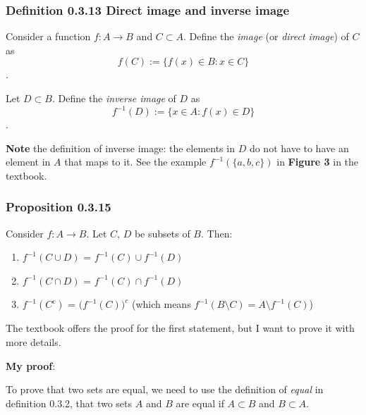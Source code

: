 \documentclass[12pt, letterpaper, oneside]{book}
\begin{document}
\subsubsection*{Definition 0.3.13 Direct image and inverse image}

Consider a function $f: A \rightarrow B$ and $C \subset A$. Define the
\textit{image} (or \textit{direct image}) of $C$ as \[ f(C) := \{f(x) \in B:
x \in C\} \].

Let $D \subset B$. Define the \textit{inverse image} of $D$ as \[ f^{-1}(D) :=
\{x \in A: f(x) \in D\}\].

\textbf{Note} the definition of inverse image: the elements in $D$ do not have
to have an element in $A$ that maps to it. See the example $f^{-1}(\{a,b,c\})$
in \textbf{Figure 3} in the textbook.

\subsubsection*{Proposition 0.3.15}

Consider $f: A \rightarrow B$. Let $C$, $D$ be subsets of $B$. Then:
\begin{enumerate}
  \item $f^{-1}(C \cup D)$ = $f^{-1}(C) \cup f^{-1}(D)$
  \item $f^{-1}(C \cap D)$ = $f^{-1}(C) \cap f^{-1}(D)$
  \item $f^{-1}(C^c)$ = $\bigl(f^{-1}(C)\bigr)^c$ (which means $f^{-1}(B
    \setminus C) = A \setminus f^{-1}(C)$)
\end{enumerate}

The textbook offers the proof for the first statement, but I want to prove it
with more details.

\textbf{My proof}:

To prove that two sets are equal, we need to use the definition of \textit{
equal} in definition 0.3.2, that two sets $A$ and $B$ are equal if $A \subset B$
and $B \subset A$.
\end{document}
